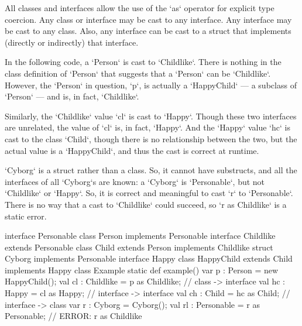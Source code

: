 All classes and interfaces allow the use of the \xcd`as` operator for explicit
type coercion.  
Any class or
interface may be cast to any interface.  
Any interface may be cast to
any class.  Also, any interface can be cast to a struct that implements
(directly or indirectly) that interface.

\begin{ex}
In the following code, a \xcd`Person` is cast to \xcd`Childlike`.  There is
nothing in the class definition of \xcd`Person` that suggests that a
\xcd`Person` can be \xcd`Childlike`.  However, the \xcd`Person` in question,
\xcd`p`, is actually a \xcd`HappyChild` --- a subclass of \xcd`Person` --- and
is, in fact, \xcd`Childlike`.  

Similarly, the \xcd`Childlike` value \xcd`cl` is cast to \xcd`Happy`.  Though
these two interfaces are unrelated, the value of \xcd`cl` is, in fact,
\xcd`Happy`.  And the \xcd`Happy` value \xcd`hc` is cast to the class
\xcd`Child`, though there is no relationship between the two, but the actual
value is a \xcd`HappyChild`, and thus the cast is correct at runtime.

\xcd`Cyborg` is a struct rather than a class.  So, it cannot have substructs,
and all the interfaces of all \xcd`Cyborg`s are known: a \xcd`Cyborg` is
\xcd`Personable`, but not \xcd`Childlike` or \xcd`Happy`.  So, it is correct
and meaningful to cast \xcd`r` to \xcd`Personable`.  There is no way that a
cast to \xcd`Childlike` could succeed, so \xcd`r as Childlike` is a static error.

\begin{xten}
interface Personable {}
class Person implements Personable {}
interface Childlike extends Personable {}
class Child extends Person implements Childlike {}
struct Cyborg implements Personable {}
interface Happy {}
class HappyChild extends Child implements Happy {}
class Example {
  static def example() {
    var p : Person = new HappyChild();
    val cl : Childlike = p as Childlike; // class -> interface
    val hc : Happy = cl as Happy; //        interface -> interface
    val ch : Child = hc as Child; //        interface -> class
    var r : Cyborg = Cyborg();
    val rl : Personable = r as Personable; 
    // ERROR: r as Childlike
  }
}
\end{xten}




\end{ex}


